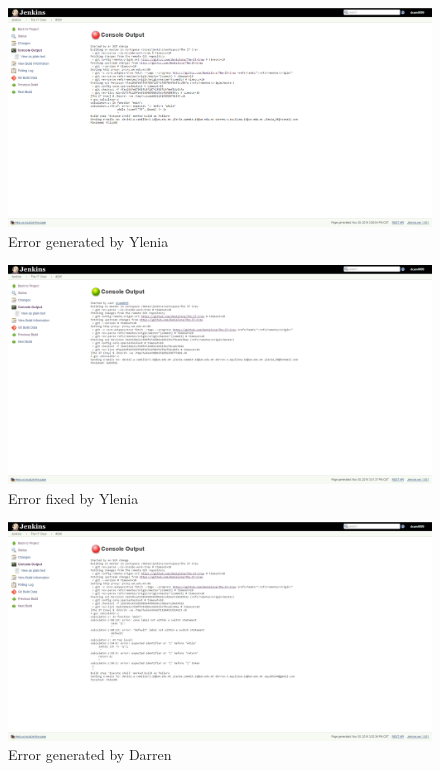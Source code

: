 \documentclass[UTF8]{article}
\begin{document}
\newpage
\begin{figure}[h]
  \includegraphics[width=\textwidth, height=\textheight,keepaspectratio]{Break2Ylenia.PNG}
  \caption{Error generated by Ylenia}
\end{figure}

\begin{figure}[h]
  \includegraphics[width=\textwidth, height=\textheight,keepaspectratio]{Fix2Ylenia.PNG}
  \caption{Error fixed by Ylenia}
\end{figure}

\newpage
\begin{figure}[h]
  \includegraphics[width=\textwidth, height=\textheight,keepaspectratio]{Break3Darren.PNG}
  \caption{Error generated by Darren}
\end{figure}
\end{document}
